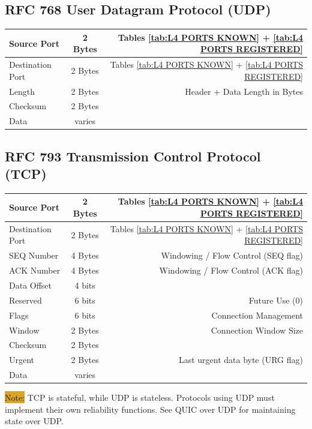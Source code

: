 \documentclass[12pt]{article}
\newcommand{\note}[1]{\colorbox{#1}{Note:}}
\begin{document}
	\subsection{RFC 768 User Datagram Protocol (UDP) \label{subsec:UDP}}
	\begin{table}[H]
	\centering
	\begin{tabular}{| l | c | r |}
	\hline
	Source Port		& 2 Bytes	& Tables \ref{tab:L4 PORTS KNOWN} + \ref{tab:L4 PORTS REGISTERED}\\\hline
	Destination Port	& 2 Bytes	& Tables \ref{tab:L4 PORTS KNOWN} + \ref{tab:L4 PORTS REGISTERED}\\\hline
	Length		& 2 Bytes	& Header + Data Length in Bytes\\\hline
	Checksum		& 2 Bytes	&\\\hline
	Data			& varies	&\\\hline
	\end{tabular}\end{table}


	\subsection{RFC 793 Transmission Control Protocol (TCP) \label{subsec:TCP}}
	\begin{table}[H]
	\centering
	\begin{tabular}{| l | c | r |}
	\hline
	Source Port		& 2 Bytes	& Tables \ref{tab:L4 PORTS KNOWN} + \ref{tab:L4 PORTS REGISTERED}\\\hline
	Destination Port	& 2 Bytes	& Tables \ref{tab:L4 PORTS KNOWN} + \ref{tab:L4 PORTS REGISTERED}\\\hline
	SEQ Number	& 4 Bytes	& Windowing / Flow Control (SEQ flag)\\\hline
	ACK Number	& 4 Bytes	& Windowing / Flow Control (ACK flag)\\\hline
	Data Offset		& 4 bits	&\\\hline
	Reserved		& 6 bits	& Future Use (0)\\\hline
	Flags			& 6 bits	& Connection Management\\\hline
	Window		& 2 Bytes	& Connection Window Size\\\hline
	Checksum		& 2 Bytes	&\\\hline
	Urgent		& 2 Bytes	& Last urgent data byte (URG flag)\\\hline
	Data			& varies	&\\\hline
	\end{tabular}\end{table}
	\note{Goldenrod} TCP is stateful, while UDP is stateless. Protocols using UDP must implement their own reliability functions. See QUIC over UDP for maintaining state over UDP.
\end{document}
